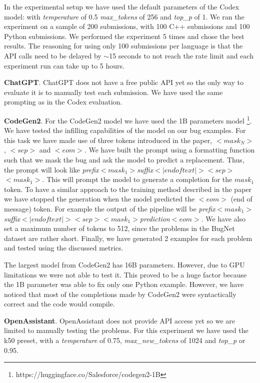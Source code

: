 \documentclass[12pt,a4paper]{report}
\begin{document}
In the experimental setup we have used the default parameters of the Codex model: with \textit{temperature} of 0.5 \textit{max\_tokens} of 256 and \textit{top\_p} of 1. We ran the experiment on a sample of 200 submissions, with 100 C++ submissions and 100 Python submissions. We performed the experiment 5 times and chose the best results. The reasoning for using only 100 submissions per language is that the API calls need to be delayed by $\sim$15 seconds to not reach the rate limit and each experiment run can take up to 5 hours.

\textbf{ChatGPT}. ChatGPT does not have a free public API yet so the only way to evaluate it is to manually test each submission. We have used the same prompting as in the Codex evaluation.

\textbf{CodeGen2}. For the CodeGen2 model we have used the 1B parameters model \footnote{https://huggingface.co/Salesforce/codegen2-1B}. We have tested the infilling capabilities of the model on our bug examples. For this task we have made use of three tokens introduced in the paper, $<mask_N>$, $<sep>$ and $<eom>$. We have built the prompt using a formatting function such that we mask the bug and ask the model to predict a replacement. Thus, the prompt will look like \textit{prefix}$<mask_1>$\textit{suffix}$<|endoftext|>$$<sep>$$<mask_1>$. This will prompt the model to generate a completion for the $mask_1$ token. To have a similar approach to the training method described in the paper we have stopped the generation when the model predicted the $<eom>$ (end of message) token. For example the output of the pipeline will be \textit{prefix}$<mask_1>$\textit{suffix}$<|endoftext|>$$<sep>$$<mask_1>$\textit{prediction}$<eom>$. We have also set a maximum number of tokens to 512, since the problems in the BugNet dataset are rather short. Finally, we have generated 2 examples for each problem and tested using the discussed metrics.

The largest model from CodeGen2 has 16B parameters. However, due to GPU limitations we were not able to test it. This proved to be a huge factor because the 1B parameter was able to fix only one Python example. However, we have noticed that most of the completions made by CodeGen2 were syntactically correct and the code would compile.

\textbf{OpenAssistant}. OpenAssistant does not provide API access yet so we are limited to manually testing the problems. For this experiment we have used the k50 preset, with a \textit{temperature} of 0.75, \textit{max\_new\_tokens} of 1024 and \textit{top\_p} or 0.95.
\end{document}
